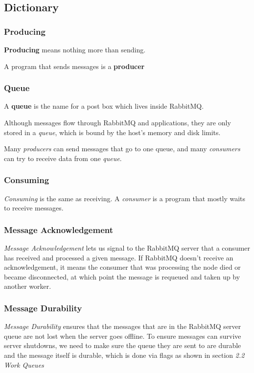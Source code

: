 \documentclass{article}
\begin{document}
\subsection{Dictionary}

\subsubsection{Producing}

\textbf{Producing} means nothing more than sending.

A program that sends messages is a \textbf{producer}

\subsubsection{Queue}

A \textbf{queue} is the name for a post box which lives inside RabbitMQ.

Although messages flow through RabbitMQ and applications, they are only stored in a \textit{queue}, which is bound by the host's memory and disk limits. 

Many \textit{producers} can send messages that go to one queue, and many \textit{consumers} can try to receive data from one \textit{queue}.

\subsubsection{Consuming}

\textit{Consuming} is the same as receiving. A \textit{consumer} is a program that mostly waits to receive messages.

\subsubsection{Message Acknowledgement}

\textit{Message Acknowledgement} lets us signal to the RabbitMQ server that a consumer has received and processed a given message. If RabbitMQ doesn't receive an acknowledgement, it means the consumer that was processing the node died or became disconnected, at which point the message is requeued and taken up by another worker.

\subsubsection{Message Durability}

\textit{Message Durability} ensures that the messages that are in the RabbitMQ server queue are not lost when the server goes offline. To ensure messages can survive server shutdowns, we need to make sure the queue they are sent to are durable and the message itself is durable, which is done via flags as shown in section \textit{2.2 Work Queues}
\end{document}
